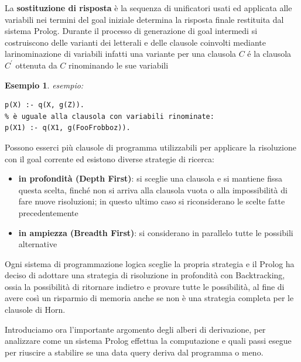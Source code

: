 \documentclass[a4paper]{report}
\newtheorem{esempio}{Esempio}
\begin{document}
La \textbf{sostituzione di risposta} è la sequenza di unificatori usati ed applicata alle variabili nei termini del goal iniziale
determina la risposta finale restituita dal sistema Prolog.\newline
Durante il processo di generazione di goal intermedi si costruiscono delle varianti dei letterali e delle clausole coinvolti
mediante larinominazione di variabili infatti una variante per una clausola $C$ é la clausola $C^{'}$ ottenuta da $C$ rinominando le sue variabili
\begin{esempio}
esempio:
\begin{verbatim}
p(X) :- q(X, g(Z)).
% è uguale alla clausola con variabili rinominate:
p(X1) :- q(X1, g(FooFrobboz)).
\end{verbatim}
\end{esempio}
Possono esserci più clausole di programma utilizzabili per applicare la risoluzione con il goal corrente ed esistono diverse strategie di ricerca:
\begin{itemize}
\item \textbf{in profondità (Depth First)}: si sceglie una clausola e si mantiene fissa questa scelta, finché non si arriva alla clausola vuota o alla impossibilità di fare nuove risoluzioni; in questo ultimo caso si riconsiderano le scelte fatte precedentemente
\item \textbf{in ampiezza (Breadth First)}: si considerano in parallelo tutte le possibili alternative
\end{itemize}
Ogni sistema di programmazione logica sceglie la propria strategia e il Prolog ha deciso di adottare una strategia di risoluzione
in profondità con Backtracking, ossia la possibilità di ritornare indietro e provare tutte le possibilità, al fine di avere così
un risparmio di memoria anche se non è una strategia completa per le clausole di Horn.

Introduciamo ora l'importante argomento degli alberi di derivazione, per analizzare come un sistema Prolog effettua la computazione
e quali passi esegue per riuscire a stabilire se una data query deriva dal programma o meno.
\end{document}
